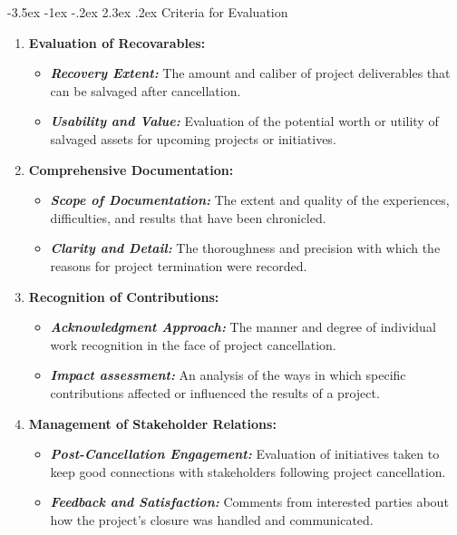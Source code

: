 \documentclass[11pt]{article}
\makeatletter
\renewcommand\section{\@startsection {section}{1}{\z@}%
                                       {-3.5ex \@plus -1ex \@minus -.2ex}%
                                       {2.3ex \@plus.2ex}%
                                       {\normalfont\fontfamily{phv}\fontsize{14}{17}\bfseries}}
\makeatother
\begin{document}
{    \section{Criteria for Evaluation }
    \begin{enumerate}
        \item \textbf{Evaluation of Recovarables:}
                \begin{itemize}
                    \item \textbf{\textit{Recovery Extent:}} The amount and caliber of project deliverables that can be salvaged after cancellation.
                    \item \textbf{\textit{Usability and Value:}} Evaluation of the potential worth or utility of salvaged assets for upcoming projects or initiatives.
                \end{itemize}
        \item \textbf{Comprehensive Documentation:}
                \begin{itemize}
                    \item \textbf{\textit{Scope of Documentation:}} The extent and quality of the experiences, difficulties, and results that have been chronicled.
                    \item \textbf{\textit{Clarity and Detail:}} The thoroughness and precision with which the reasons for project termination were recorded. 
                \end{itemize}
        \item \textbf{Recognition of Contributions:}
                \begin{itemize}
                    \item \textbf{\textit{Acknowledgment Approach:}} The manner and degree of individual work recognition in the face of project cancellation.
                    \item \textbf{\textit{Impact assessment:}} An analysis of the ways in which specific contributions affected or influenced the results of a project.
                \end{itemize}
        \item \textbf{Management of Stakeholder Relations:}
                \begin{itemize}
                    \item \textbf{\textit{Post-Cancellation Engagement:}} Evaluation of initiatives taken to keep good connections with stakeholders following project cancellation.
                    \item \textbf{\textit{Feedback and Satisfaction:}} Comments from interested parties about how the project's closure was handled and communicated.

\end{itemize}
\end{enumerate}}
\end{document}
